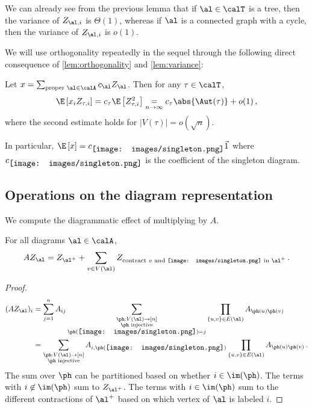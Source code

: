 \documentclass[12pt]{article}
\newcommand{\rootpic}{\vcenter{\hbox{\texttt{[image: images/singleton.png]}}}}
\newcommand{\smallrootpic}{\vcenter{\hbox{\texttt{[image: images/singleton.png]}}}}
\begin{document}
We can already see from the previous lemma that if $\al \in \calT$ is a tree,
then the variance of $Z_{\al,i}$ is $\Theta(1)$,
whereas if $\al$ is a connected graph with a cycle, then the variance of $Z_{\al,i}$ is $o(1)$.

We will use orthogonality repeatedly in the sequel through the following direct consequence of \cref{lem:orthogonality} and \cref{lem:variance}:

\begin{corollary}
\label{lem:constant}
    Let $x = \sum_{\textnormal{proper }\al \in \calA} c_\al Z_\al$. Then for any $\tau\in\calT$,
    \[
        \E\left[x_i Z_{\tau,i}\right] = c_\tau \E\left[Z_{\tau,i}^2\right] 
        \underset{n\to\infty}{=} c_\tau \abs{\Aut(\tau)} + o(1)\,,
    \]
    where the second estimate holds for $|V(\tau)| = o(\sqrt{n})$.

    In particular, $\E \left[x\right] = c_{\smallrootpic} \vec{1}$ where $c_{\smallrootpic}$
    is the coefficient of the singleton diagram.
\end{corollary}


\subsection{Operations on the diagram representation}
\label{sec:derivation-asymptotic}

We compute the diagrammatic effect of multiplying by $A$.
\begin{lemma}\label{lem:mat-mul}
    For all diagrams $\al \in \calA$,
    \[AZ_\al = Z_{\al^+} + \sum_{v \in V(\al)} Z_{\textnormal{contract $v$ and $\rootpic$ in $\al^+$}}\,.\]
\end{lemma}
\begin{proof}
\begin{align*}
    (AZ_\al)_i
    &= \sum_{j = 1}^n A_{ij} \sum_{\substack{\ph: V(\al) \to [n]\\\ph\text{ injective}\\\ph(\smallrootpic) = j}} \prod_{\{u,v\} \in E(\al)} A_{\ph(u)\ph(v)}\\
    &= \sum_{\substack{\ph: V(\al) \to [n]\\\ph \text{ injective}}} A_{i,\ph(\smallrootpic)}\prod_{\{u,v\} \in E(\al)} A_{\ph(u)\ph(v)}\,.
\end{align*}
The sum over $\ph$ can be partitioned based on whether $i \in \im(\ph)$.
The terms with $i \not \in \im(\ph)$ sum to $Z_{\al^+}$.
The terms with $i \in \im(\ph)$ sum to the different contractions
of $\al^+$ based
on which vertex of $\al$ is labeled $i$.
\end{proof}
\end{document}
